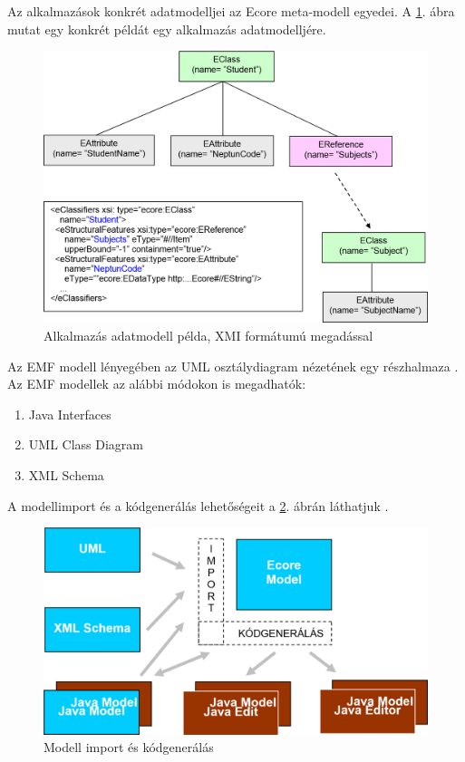 Az alkalmazások konkrét adatmodelljei az Ecore meta-modell egyedei.
A \ref{fig:DataModelWithXMI}. ábra mutat egy konkrét példát egy alkalmazás adatmodelljére.
%
\begin{figure}[htb]
\centering
\includegraphics[width=\textwidth]{figures/datamodel-example-with-xmi-desc.png}
\caption{Alkalmazás adatmodell példa, XMI formátumú megadással}
\label{fig:DataModelWithXMI}
\end{figure}
%
Az EMF modell lényegében az UML osztálydiagram nézetének egy részhalmaza \cite{EMFFundamentals}.
Az EMF modellek az alábbi módokon is megadhatók:
\begin{enumerate}
	\item Java Interfaces
	\item UML Class Diagram
	\item XML Schema
\end{enumerate}
A modellimport és a kódgenerálás lehetőségeit a \ref{fig:ModelImportAndCodegen}. ábrán láthatjuk \cite{EMFFundamentals}.
%
\begin{figure}[!b]
\centering
\includegraphics[width=\textwidth]{figures/model-import-and-codegen.png}
\caption{Modell import és kódgenerálás}
\label{fig:ModelImportAndCodegen}
\end{figure}
